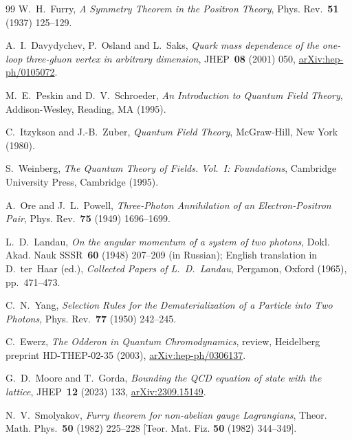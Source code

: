 \documentclass[UTF8,a4paper,11pt,fontset=fandol]{ctexart}
\theoremstyle{cplain}
\theoremstyle{cdefinition}
\theoremstyle{cremark}
\numberwithin{equation}{section}
\begin{document}
\begin{thebibliography}{99}
W.~H.~Furry, \emph{A Symmetry Theorem in the Positron Theory}, Phys. Rev.~\textbf{51} (1937) \mbox{125--129}.

A.~I.~Davydychev, P.~Osland and L.~Saks, \emph{Quark mass dependence of the one-loop three-gluon vertex in arbitrary dimension}, JHEP~\textbf{08} (2001) \mbox{050}, \href{https://arxiv.org/abs/hep-ph/0105072}{arXiv:hep-ph/0105072}.

M.~E.~Peskin and D.~V.~Schroeder, \emph{An Introduction to Quantum Field Theory}, Addison-Wesley, Reading, MA (1995).

C.~Itzykson and J.-B.~Zuber, \emph{Quantum Field Theory}, McGraw-Hill, New York (1980).

S.~Weinberg, \emph{The Quantum Theory of Fields. Vol.~I: Foundations}, Cambridge University Press, Cambridge (1995).

A.~Ore and J.~L.~Powell, \emph{Three-Photon Annihilation of an Electron-Positron Pair}, Phys. Rev.~\textbf{75} (1949) \mbox{1696--1699}.

L.~D.~Landau, \emph{On the angular momentum of a system of two photons}, Dokl. Akad. Nauk SSSR~\textbf{60} (1948) \mbox{207--209} (in Russian); English translation in D.~ter~Haar (ed.), \emph{Collected Papers of L.~D.~Landau}, Pergamon, Oxford (1965), pp.~\mbox{471--473}.

C.~N.~Yang, \emph{Selection Rules for the Dematerialization of a Particle into Two Photons}, Phys. Rev.~\textbf{77} (1950) \mbox{242--245}.

C.~Ewerz, \emph{The Odderon in Quantum Chromodynamics}, review, Heidelberg preprint \mbox{HD-THEP-02-35} (2003), \href{https://arxiv.org/abs/hep-ph/0306137}{arXiv:hep-ph/0306137}.

G.~D.~Moore and T.~Gorda, \emph{Bounding the QCD equation of state with the lattice}, JHEP~\textbf{12} (2023) \mbox{133}, \href{https://arxiv.org/abs/2309.15149}{arXiv:2309.15149}.

N.~V.~Smolyakov, \emph{Furry theorem for non-abelian gauge Lagrangians}, Theor. Math. Phys.~\textbf{50} (1982) \mbox{225--228} [Teor. Mat. Fiz. \textbf{50} (1982) \mbox{344--349}].


\end{thebibliography}
\end{document}
